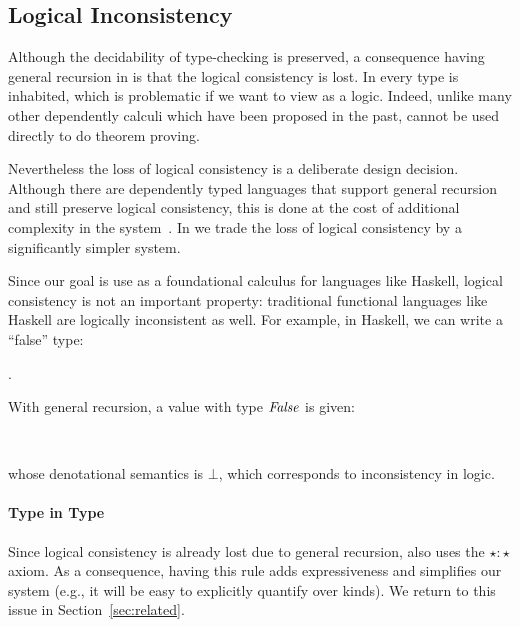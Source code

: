 \subsection{Logical Inconsistency}
Although the decidability of type-checking is preserved, a consequence
having general recursion in \name is that the logical consistency is
lost. In \name every type is inhabited, which is problematic if we
want to view \name as a logic. Indeed, unlike many other dependently 
calculi which have been proposed in the past, \name cannot be used 
directly to do theorem proving.

Nevertheless the loss of logical consistency is a deliberate design
decision. Although there are dependently typed languages that support
general recursion and still preserve logical consistency, this is done
at the cost of additional complexity in the
system~\cite{}.  In \name we trade the loss of
logical consistency by a significantly simpler system.

Since our goal is 
use \name as a foundational calculus for languages like Haskell,
logical consistency is not an important property: traditional 
functional languages like Haskell are logically inconsistent as well. 
For example, in Haskell, we can write a ``false'' type:
\begin{hscode}\SaveRestoreHook
{}%
%
%
\>[3]{}\;\mathrel{=}\forall {}\hsforall .\,\<[E]%
\ColumnHook
\end{hscode}\resethooks
With general recursion, a value with type \ensuremath{\Conid{False}} is given:
\begin{hscode}\SaveRestoreHook
{}%
%
%
\>[3]{}\mathbin{::}\<[E]%
\\
\>[3]{}\mathrel{=}\<[E]%
\ColumnHook
\end{hscode}\resethooks
whose denotational semantics is \ensuremath{\bot }, which corresponds to
inconsistency in logic. 

\paragraph{Type in Type}
Since logical consistency is already lost due to general recursion, 
\name also uses the $\star : \star$ axiom. 
As a consequence, having this rule adds expressiveness and
simplifies our system (e.g., it will be easy to explicitly quantify
over kinds). We return to this issue in Section~\ref{sec:related}.

